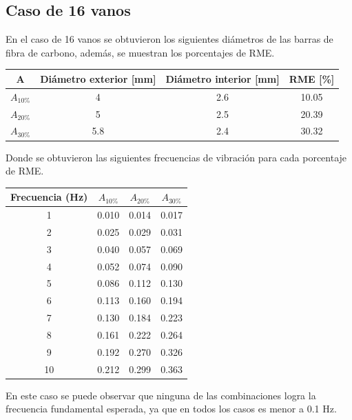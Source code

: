 \newpage

\subsection{Caso de 16 vanos}
En el caso de 16 vanos se obtuvieron los siguientes diámetros de las barras de fibra de carbono, además, se muestran los porcentajes de RME.

\begin{table}[H]
    \centering
    \begin{tabular}{cccc}
    \toprule
     A & Diámetro exterior [mm] & Diámetro interior [mm] & RME [\%] \\
    \midrule
     $A_{10\%}$ &  4 &  2.6 &  10.05 \\
     $A_{20\%}$ &  5 &  2.5 &  20.39 \\
     $A_{30\%}$ &  5.8 &  2.4 &  30.32 \\
    \bottomrule
    \end{tabular}
\end{table}

Donde se obtuvieron las siguientes frecuencias de vibración para cada porcentaje de RME.

\begin{table}[H]
    \centering
    \begin{tabular}{cccc}
    \toprule
     Frecuencia (Hz) & $A_{10\%}$ & $A_{20\%}$ & $A_{30\%}$ \\
    \midrule
     1 &       0.010 &       0.014 &       0.017 \\
     2 &       0.025 &       0.029 &       0.031 \\
     3 &       0.040 &       0.057 &       0.069 \\
     4 &       0.052 &       0.074 &       0.090 \\
     5 &       0.086 &       0.112 &       0.130 \\
     6 &       0.113 &       0.160 &       0.194 \\
     7 &       0.130 &       0.184 &       0.223 \\
     8 &       0.161 &       0.222 &       0.264 \\
     9 &       0.192 &       0.270 &       0.326 \\
     10 &       0.212 &       0.299 &       0.363 \\
    \bottomrule
    \end{tabular}
\end{table}

En este caso se puede observar que ninguna de las combinaciones logra la frecuencia fundamental esperada, ya que en todos los casos es menor a 0.1 Hz.

